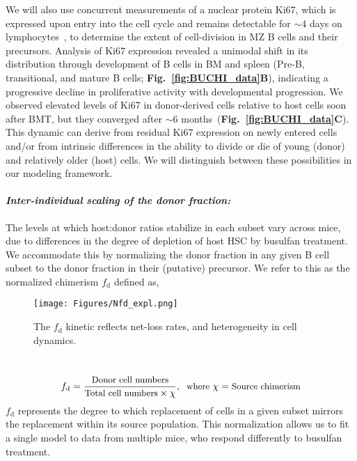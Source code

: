 \documentclass[11pt]{article}
\newcommand{\para}[1]{\vspace*{-4.5mm}\paragraph{#1}}
\begin{document}
We will also use concurrent measurements of  a nuclear protein Ki67, which is expressed upon entry into the cell cycle and remains detectable for $\sim$4 days on lymphocytes~\cite{Gossel_2017, Verheijen_2020}, to determine the extent of cell-division in MZ B cells and their precursors.
Analysis of Ki67 expression revealed a unimodal shift in its distribution through development of B cells in BM and spleen (Pre-B, transitional, and mature B cells; \textbf{Fig.~\ref{fig:BUCHI_data}B}), indicating a progressive decline in proliferative activity with developmental progression.
We observed elevated levels of Ki67 in donor-derived cells relative to host cells soon after BMT, but they converged after $\sim$6 months~(\textbf{Fig.~\ref{fig:BUCHI_data}C}).
This dynamic can derive from residual Ki67 expression on newly entered cells and/or from intrinsic differences in the ability to divide or die of young (donor) and relatively older (host) cells.
We will distinguish between these possibilities in our modeling framework.

\para{\textit{Inter-individual scaling of the donor fraction:}}
The levels at which host:donor ratios stabilize in each subset vary across mice, due to differences in the degree of depletion of host HSC by busulfan treatment. We accommodate this by normalizing the donor fraction in any given B cell subset to the donor fraction in their (putative) precursor. We refer to this as the normalized chimerism $f_\text{d}$ defined as,

\begin{wrapfigure}{r}{0.22\textwidth}
\centering
\vspace*{-9mm}
\texttt{[image: Figures/Nfd\_expl.png]}
\vspace*{-8mm}
\caption{{The $f_\text{d}$ kinetic  reflects net-loss rates, and heterogeneity in cell dynamics.}}%
\label{fig:Repop}
\vspace*{-2mm}
\end{wrapfigure}
~
\begin{equation}
\small
f_\text{d} = \frac{\text{Donor cell numbers}}{\text{Total cell numbers} \times \chi}, \;\; \text{where } \chi  =\text{Source chimerism}
\label{eq:Nfd}
\end{equation}
$f_\text{d}$ represents the degree to which replacement of cells in a given subset mirrors the replacement within its source population.
This normalization allows us to fit a single model to data from multiple mice, who respond differently to busulfan treatment.
\end{document}
